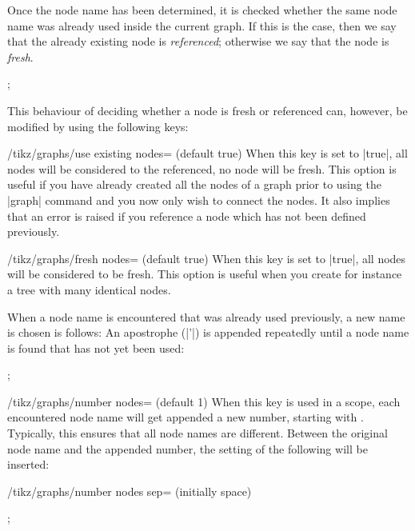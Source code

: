Once the node name has been determined, it is checked whether the same node
name was already used inside the current graph. If this is the case, then we
say that the already existing node is \emph{referenced}; otherwise we say that
the node is \emph{fresh}.
%
\begin{codeexample}[]
\tikz {};
\end{codeexample}

This behaviour of deciding whether a node is fresh or referenced can, however,
be modified by using the following keys:
%
\begin{key}{/tikz/graphs/use existing nodes= (default true)}
    When this key is set to |true|, all nodes will be considered to the
    referenced, no node will be fresh. This option is useful if you have
    already created all the nodes of a graph prior to using the |graph| command
    and you now only wish to connect the nodes. It also implies that an error
    is raised if you reference a node which has not been defined previously.
\end{key}

\begin{key}{/tikz/graphs/fresh nodes= (default true)}
    When this key is set to |true|, all nodes will be considered to be fresh.
    This option is useful when you create for instance a tree with many
    identical nodes.

    When a node name is encountered that was already used previously, a new
    name is chosen is follows: An apostrophe (|'|) is appended repeatedly until
    a node name is found that has not yet been used:
\begin{codeexample}[]
\tikz {};
\end{codeexample}
\end{key}

\begin{key}{/tikz/graphs/number nodes= (default 1)}
    When this key is used in a scope, each encountered node name will get
    appended a new number, starting with . Typically, this ensures
    that all node names are different. Between the original node name and the
    appended number, the setting of the following will be inserted:
    \begin{key}{/tikz/graphs/number nodes sep= (initially \normalfont space)}
    \end{key}
\begin{codeexample}[]
\tikz {};
\end{codeexample}
\end{key}

